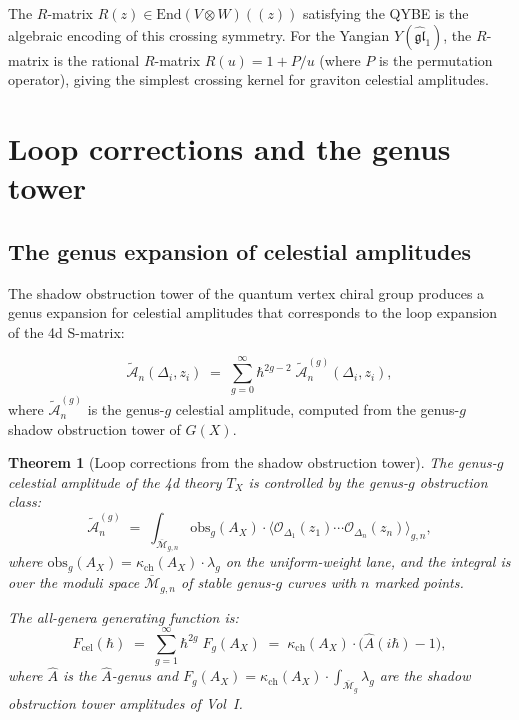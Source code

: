 \documentclass[11pt]{article}
\newtheorem{theorem}{Theorem}[section]
\theoremstyle{definition}
\theoremstyle{remark}
\newcommand{\cA}{\mathcal{A}}
\newcommand{\cM}{\mathcal{M}}
\newcommand{\cO}{\mathcal{O}}
\newcommand{\End}{\mathrm{End}}
\begin{document}
The $R$-matrix
$R(z) \in \End(V \otimes W)((z))$ satisfying the QYBE is the
algebraic encoding of this crossing symmetry. For the Yangian
$Y(\widehat{\mathfrak{gl}}_1)$, the $R$-matrix is the rational
$R$-matrix $R(u) = 1 + P/u$ (where $P$ is the permutation
operator), giving the simplest crossing kernel for graviton
celestial amplitudes.

\section{Loop corrections and the genus tower}
\label{sec:loop-corrections}

\subsection{The genus expansion of celestial amplitudes}

The shadow obstruction tower of the quantum vertex chiral group produces a
genus expansion for celestial amplitudes that corresponds to the
loop expansion of the 4d S-matrix:

\begin{equation}\label{eq:genus-expansion-celestial}
\widetilde{\cA}_n(\Delta_i, z_i)
\;=\;
\sum_{g=0}^{\infty}
\hbar^{2g-2}\;
\widetilde{\cA}_n^{(g)}(\Delta_i, z_i),
\end{equation}
where $\widetilde{\cA}_n^{(g)}$ is the genus-$g$ celestial
amplitude, computed from the genus-$g$ shadow obstruction tower of $G(X)$.

\begin{theorem}[Loop corrections from the shadow obstruction tower]
\label{thm:loop-corrections}
The genus-$g$ celestial amplitude of the 4d theory $T_X$ is
controlled by the genus-$g$ obstruction class:
\begin{equation}\label{eq:genus-g-celestial}
\widetilde{\cA}_n^{(g)}
\;=\;
\int_{\overline{\cM}_{g,n}}
\mathrm{obs}_g(A_X) \cdot
\langle \cO_{\Delta_1}(z_1) \cdots \cO_{\Delta_n}(z_n)
\rangle_{g,n},
\end{equation}
where $\mathrm{obs}_g(A_X) = \kappa_{\mathrm{ch}}(A_X) \cdot \lambda_g$ on the
uniform-weight lane, and the integral is over the moduli space
$\overline{\cM}_{g,n}$ of stable genus-$g$ curves with $n$ marked
points.

The all-genera generating function is:
\begin{equation}\label{eq:all-genera-celestial}
F_{\mathrm{cel}}(\hbar)
\;=\;
\sum_{g=1}^{\infty} \hbar^{2g}\;
F_g(A_X)
\;=\;
\kappa_{\mathrm{ch}}(A_X) \cdot
\bigl(\hat{A}(i\hbar) - 1\bigr),
\end{equation}
where $\hat{A}$ is the $\hat{A}$-genus and $F_g(A_X) =
\kappa_{\mathrm{ch}}(A_X) \cdot \int_{\overline{\cM}_g} \lambda_g$ are the
shadow obstruction tower amplitudes of Vol~I.
\end{theorem}
\end{document}

